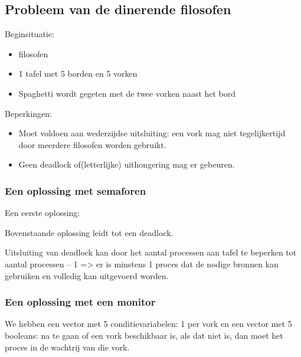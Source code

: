 \subsection{Probleem van de dinerende filosofen}

Beginsituatie:

\begin{itemize}
\item filosofen
\item 1  tafel met 5 borden en 5 vorken
\item Spaghetti wordt gegeten met de twee vorken naast het bord 
\end{itemize}

Beperkingen:

\begin{itemize}
\item Moet voldoen aan wederzijdse uitsluiting: een vork mag niet tegelijkertijd door meerdere filosofen worden gebruikt.
\item Geen deadlock of(letterlijke) uithongering mag er gebeuren.
\end{itemize}

\subsubsection{Een oplossing met semaforen }

Een eerste oplossing:
 

Bovenstaande oplossing leidt tot een deadlock.




Uitsluiting van deadlock kan door het aantal processen aan tafel te beperken tot aantal processen – 1 => er is minstens 1 proces dat de nodige bronnen kan gebruiken en volledig kan uitgevoerd worden.


\subsubsection{Een oplossing met een monitor}
We hebben een vector met 5 conditievariabelen: 1 per vork en een vector met 5 booleans: na te gaan of een vork beschikbaar is, als dat niet is, dan moet het proces in de wachtrij van die vork.